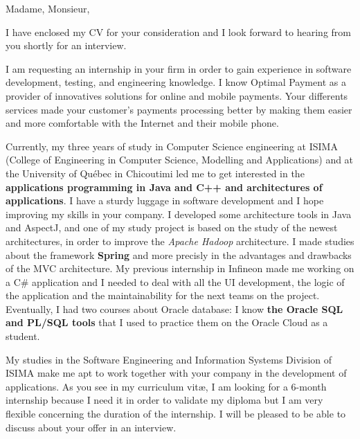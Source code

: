 \date{\today}
\opening{Madame, Monsieur,}
\closing{I have enclosed my CV for your consideration and I look forward to hearing from you shortly for an interview.}

\makelettertitle

I am requesting an internship in your firm in order to gain experience in software development, testing, and engineering knowledge. I know Optimal Payment as a provider of innovatives solutions for online and mobile payments. Your differents services made your customer's payments processing better by making them easier and more comfortable with the Internet and their mobile phone.

Currently, my three years of study in Computer Science engineering at ISIMA (College of Engineering in Computer Science, Modelling and Applications) and at the University of Québec in Chicoutimi led me to get interested in the \textbf{applications programming in Java and C++ and architectures of applications}. I have a sturdy luggage in software development and I hope improving my skills in your company. I developed some architecture tools in Java and AspectJ, and one of my study project is based on the study of the newest architectures, in order to improve the \textit{Apache Hadoop} architecture. I made studies about the framework \textbf{Spring} and more precisly in the advantages and drawbacks of the MVC architecture. My previous internship in Infineon made me working on a C\# application and I needed to deal with all the UI development, the logic of the application and the maintainability for the next teams on the project. Eventually, I had two courses about Oracle database: I know \textbf{the Oracle SQL and PL/SQL tools} that I used to practice them on the Oracle Cloud as a student.

My studies in the Software Engineering and Information Systems Division of ISIMA make me apt to work together with your company in the development of applications. As you see in my curriculum vit\ae{}, I am looking for a 6-month internship because I need it in order to validate my diploma but I am very flexible concerning the duration of the internship. I will be pleased to be able to discuss about your offer in an interview.

\makeletterclosing
